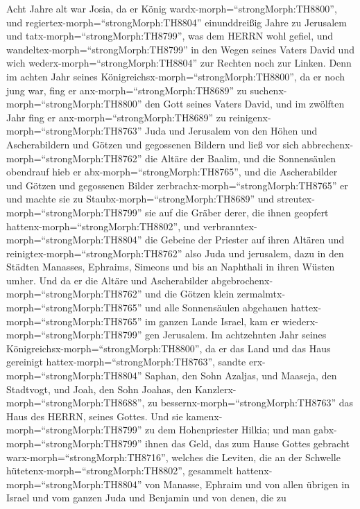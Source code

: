  Acht Jahre alt war Josia, da er König
wardx-morph=``strongMorph:TH8800'', und
regiertex-morph=``strongMorph:TH8804'' einunddreißig Jahre zu Jerusalem
 und tatx-morph=``strongMorph:TH8799'', was dem HERRN wohl
gefiel, und wandeltex-morph=``strongMorph:TH8799'' in den Wegen seines
Vaters David und wich wederx-morph=``strongMorph:TH8804'' zur Rechten
noch zur Linken.  Denn im achten Jahr seines
Königreichsx-morph=``strongMorph:TH8800'', da er noch jung war, fing er
anx-morph=``strongMorph:TH8689'' zu suchenx-morph=``strongMorph:TH8800''
den Gott seines Vaters David, und im zwölften Jahr fing er
anx-morph=``strongMorph:TH8689'' zu
reinigenx-morph=``strongMorph:TH8763'' Juda und Jerusalem von den Höhen
und Ascherabildern und Götzen und gegossenen Bildern  und
ließ vor sich abbrechenx-morph=``strongMorph:TH8762'' die Altäre der
Baalim, und die Sonnensäulen obendrauf hieb er
abx-morph=``strongMorph:TH8765'', und die Ascherabilder und Götzen und
gegossenen Bilder zerbrachx-morph=``strongMorph:TH8765'' er und machte
sie zu Staubx-morph=``strongMorph:TH8689'' und
streutex-morph=``strongMorph:TH8799'' sie auf die Gräber derer, die
ihnen geopfert hattenx-morph=``strongMorph:TH8802'',  und
verbranntex-morph=``strongMorph:TH8804'' die Gebeine der Priester auf
ihren Altären und reinigtex-morph=``strongMorph:TH8762'' also Juda und
jerusalem,  dazu in den Städten Manasses, Ephraims, Simeons
und bis an Naphthali in ihren Wüsten umher.  Und da er die
Altäre und Ascherabilder abgebrochenx-morph=``strongMorph:TH8762'' und
die Götzen klein zermalmtx-morph=``strongMorph:TH8765'' und alle
Sonnensäulen abgehauen hattex-morph=``strongMorph:TH8765'' im ganzen
Lande Israel, kam er wiederx-morph=``strongMorph:TH8799'' gen Jerusalem.
 Im achtzehnten Jahr seines
Königreichsx-morph=``strongMorph:TH8800'', da er das Land und das Haus
gereinigt hattex-morph=``strongMorph:TH8763'', sandte
erx-morph=``strongMorph:TH8804'' Saphan, den Sohn Azaljas, und Maaseja,
den Stadtvogt, und Joah, den Sohn Joahas, den
Kanzlerx-morph=``strongMorph:TH8688'', zu
bessernx-morph=``strongMorph:TH8763'' das Haus des HERRN, seines Gottes.
 Und sie kamenx-morph=``strongMorph:TH8799'' zu dem
Hohenpriester Hilkia; und man gabx-morph=``strongMorph:TH8799'' ihnen
das Geld, das zum Hause Gottes gebracht
warx-morph=``strongMorph:TH8716'', welches die Leviten, die an der
Schwelle hütetenx-morph=``strongMorph:TH8802'', gesammelt
hattenx-morph=``strongMorph:TH8804'' von Manasse, Ephraim und von allen
übrigen in Israel und vom ganzen Juda und Benjamin und von denen, die zu
